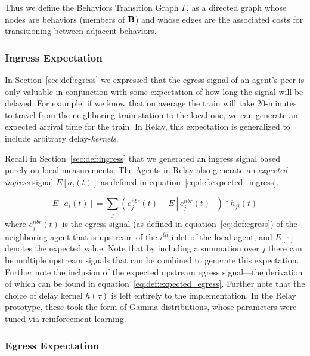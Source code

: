 \documentclass{report}
\begin{document}
Thus we define the Behaviors Transition Graph $\Gamma$, as a directed graph whose nodes are behaviors (members of $\bf{B}$) and whose edges are the associated costs for transitioning between adjacent behaviors.


\subsubsection{Ingress Expectation}
\label{sec:def:expected_ingress}

In Section~\ref{sec:def:egress} we expressed that the egress signal of an agent's peer is only valuable in conjunction with some expectation of how long the signal will be delayed.
For example, if we know that on average the train will take 20-minutes to travel from the neighboring train station to the local one, we can  generate an expected arrival time for the train.
In Relay, this expectation is generalized to include arbitrary delay-\emph{kernels}.

Recall in Section~\ref{sec:def:ingress} that we generated an ingress signal based purely on local measurements.
The Agents in Relay also generate an \emph{expected ingress} signal $E\left[a_i(t)\right]$ as defined in equation~\eqref{eq:def:expected_ingress}.

\begin{equation}\label{eq:def:expected_ingress}
	E\left[a_i(t)\right] = \sum_{j} \left(e_j^{nbr}(t) + E\left[e_j^{nbr}(t)\right] \right) * h_{ji}(t)
\end{equation}
where $e_j^{nbr}(t)$ is the egress signal (as defined in equation~\eqref{eq:def:egress}) of the neighboring agent that is upstream of the $i^{th}$ inlet of the local agent, and $E\left[ \cdot \right]$ denotes the expected value.
Note that by including a summation over $j$ there can be multiple upstream signals that can be combined to generate this expectation.
Further note the inclusion of the expected upstream egress signal---the derivation of which can be found in equation~\eqref{eq:def:expected_egress}.
Further note that the choice of delay kernel $h(\tau)$ is left entirely to the implementation.
In the Relay prototype, these took the form of Gamma distributions, whose parameters were tuned via reinforcement learning.

\subsubsection{Egress Expectation}
\label{sec:def:expected_egress}
\end{document}
